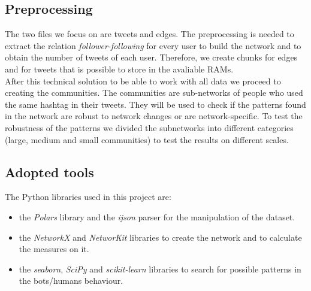 \documentclass[12pt, a4paper]{article}
\begin{document}
    \subsection{Preprocessing}
    	The two files we focus on are tweets and edges. The preprocessing is needed to extract the relation \textit{follower-following} for every user to build the network and to obtain the number of tweets of each user.	 Therefore, we create chunks for edges and for tweets that is possible to store in the avaliable RAMs.\\
        After this technical solution to be able to work with all data we proceed to creating the communities. The communities are sub-networks of people who used the same hashtag in their tweets. They will be used to check if the patterns found in the network are robust to network changes or are network-specific. To test the robustness of the patterns we divided the subnetworks into different categories (large, medium and small communities) to test the results on different scales.
	\subsection{Adopted tools}
		The Python libraries used in this project are:
        \begin{itemize}
            \item the \textit{Polars} library and the \textit{ijson} parser for the manipulation of the dataset.
            \item the \textit{NetworkX} \cite{hagberg2008} and \textit{NetworKit} \cite{staudt2016} libraries to create the network and to calculate the measures on it.
            \item the \textit{seaborn}, \textit{SciPy} and \textit{scikit-learn} libraries to search for possible patterns in the bots/humans behaviour.
        \end{itemize}
\end{document}
